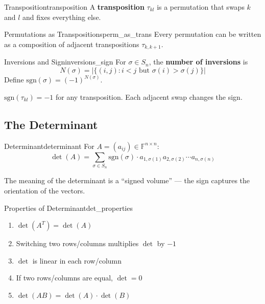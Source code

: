 \documentclass[11pt, letterpaper, openany]{book}
\begin{document}
\begin{defn}{Transposition}{transposition}
A \textbf{transposition} $\tau_{kl}$ is a permutation that swaps $k$ and $l$ and fixes everything else.
\end{defn}

\begin{lem}{Permutations as Transpositions}{perm_as_trans}
Every permutation can be written as a composition of adjacent transpositions $\tau_{k,k+1}$.
\end{lem}

\begin{defn}{Inversions and Sign}{inversions_sign}
For $\sigma \in S_n$, the \textbf{number of inversions} is
\[N(\sigma) = |\{(i,j) : i < j \text{ but } \sigma(i) > \sigma(j)\}|\]
Define $\text{sgn}(\sigma) = (-1)^{N(\sigma)}$.
\end{defn}

\begin{remark}
$\text{sgn}(\tau_{kl}) = -1$ for any transposition. Each adjacent swap changes the sign.
\end{remark}

\subsection{The Determinant}

\begin{defn}{Determinant}{determinant}
For $A = (a_{ij}) \in \mathbb{F}^{n \times n}$:
\[\det(A) = \sum_{\sigma \in S_n} \text{sgn}(\sigma) \cdot a_{1,\sigma(1)} a_{2,\sigma(2)} \cdots a_{n,\sigma(n)}\]
\end{defn}

\begin{remark}
The meaning of the determinant is a ``signed volume'' --- the sign captures the orientation of the vectors.
\end{remark}

\begin{thm}{Properties of Determinant}{det_properties}
\begin{enumerate}
    \item $\det(A^T) = \det(A)$
    \item Switching two rows/columns multiplies $\det$ by $-1$
    \item $\det$ is linear in each row/column
    \item If two rows/columns are equal, $\det = 0$
    \item $\det(AB) = \det(A) \cdot \det(B)$
\end{enumerate}
\end{thm}
\end{document}
